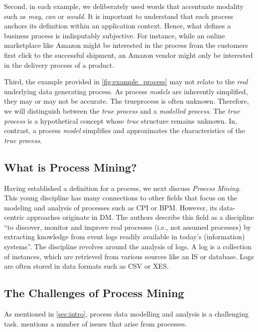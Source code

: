 \documentclass[./../../paper.tex]{subfiles}
\begin{document}
Second, in each example, we deliberately used words that accentuate modality such as \emph{may}, \emph{can} or \emph{would}. It is important to understand that each process anchors its definition within an application context. Hence, what defines a business process is indisputably subjective. For instance, while an online marketplace like Amazon might be interested in the process from the customers first click to the successful shipment, an Amazon vendor might only be interested in the delivery process of a product.

Third, the example provided in \autoref{fig:example_process} may not relate to the \emph{real} underlying data generating process. As process \emph{models} are inherently simplified, they may or may not be accurate. The \gls{trueprocess} is often unknown. Therefore, we will distinguish between the \emph{true process} and a \emph{modelled process}. The \emph{true process} is a hypothetical concept whose \emph{true} structure remains unknown. In, contrast, a process \emph{model} simplifies and approximates the characteristics of the \emph{true process}.

\subsection{What is Process Mining?}
Having established a definition for a process, we next discuss \emph{Process Mining}. This young discipline has many connections to other fields that focus on the modeling and analysis of processes such as \gls{CPI} or \gls{BPM}\autocite{vanderaalst_ProcessMiningManifesto_2012}. However, its data-centric approaches originate in \gls{DM}.
The authors \citeauthor{vanderaalst_ProcessMiningManifesto_2012} describe this field as a discipline \enquote{to discover, monitor and improve real processes (i.e., not assumed processes) by extracting knowledge from event logs readily available in today's (information) systems}\autocite{vanderaalst_ProcessMiningManifesto_2012}. The discipline revolves around the analysis of \glspl{log}.
A \gls{log} is a collection of \glspl{instance}, which are retrieved from various sources like an \gls{IS} or database. Logs are often stored in data formats such as \gls{CSV} or \gls{XES}\autocite{vanderaalst_ProcessMiningManifesto_2012}.

\subsection{The Challenges of Process Mining}
As mentioned in \autoref{sec:intro}, process data modelling and analysis is a challenging task. \citeauthor{vanderaalst_ProcessMiningManifesto_2012} mentions a number of issues that arise from processes\autocite{vanderaalst_ProcessMiningManifesto_2012}.
\end{document}
